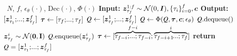 \begin{algorithm}[h]
    \caption{Initial latent construction~(\cref{subsec:diagonal})}
    \label{alg:fifo_init}
    \begin{algorithmic}
        \Require~$N$, $f$, $\epsilon_\theta(\cdot)$, $\text{Dec}(\cdot)$, $\Phi(\cdot)$
        \State \textbf{Input:} $\bm{z}_{\tau_{f}}^{1:f}\sim\mathcal{N}(0, \bm{I}), \{\tau_i\}_{i=0}^f, \bm{c}$
        \State \textbf{Output:} $[\gz_{\tau_1}^{1};\text{\myldots};\gz_{\tau_f}^{f}]$
        \State $\bm{\tau} \leftarrow [\tau_f;\text{\myldots};\tau_f]$ 
        \State $\Q \leftarrow [\gz_{\tau_f}^{1};\text{\myldots};\gz_{\tau_f}^{f}]$ 
        \State $\Q \leftarrow \Phi(\Q,\bm{\tau},\bm{c};\epsilon_\theta)$
        \vspace{1mm}
        \State $\Q\text{.dequeue}()$
        \vspace{1mm}
        \State $\bm{z}_{\tau_f}^{i}\sim \mathcal{N}(\mathbf{0},\mathbf{I})$ 
        \vspace{1mm}
        \State $\Q\text{.enqueue}(\gz_{\tau_f}^{i})$ 
        \State $\bm\tau \leftarrow [\overbrace{\tau_{f-i};\text{\myldots};\tau_{f-i}}^{f-i};\overbrace{\tau_{f-i+1}\text{\myldots};\tau_{f}}^{i}]$ 
        \EndFor
        \State \textbf{return} $\Q=[\gz_{\tau_1}^{1};\text{\myldots};\gz_{\tau_f}^{f}]$
    \end{algorithmic}
\end{algorithm}

